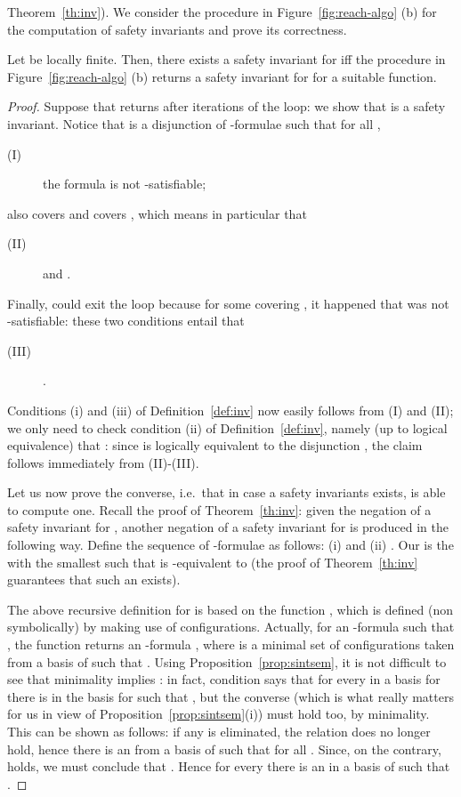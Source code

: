 \documentclass{LMCS}
\theoremstyle{plain}\newtheorem{assumption}[thm]{Assumption}
\theoremstyle{plain}\newtheorem{proposition}[thm]{Proposition}
\theoremstyle{plain}\newtheorem{property}[thm]{Property}
\theoremstyle{plain}\newtheorem{example}[thm]{Example}
\theoremstyle{plain}\newtheorem{claim}[thm]{Claim}
\theoremstyle{plain}\newtheorem{lemma}[thm]{Lemma}
\begin{document}
Theorem~\ref{th:inv}).  We consider the procedure  in
Figure~\ref{fig:reach-algo} (b) for the computation of safety
invariants and prove its correctness.
\begin{thm}
  \label{th:invsymb}
  Let  be locally finite. Then, there exists a safety invariant
  for  iff the procedure  in
  Figure~\ref{fig:reach-algo} (b) returns a safety invariant for 
  for a suitable  function.
\end{thm}
\begin{proof}
  Suppose that  returns  after  iterations of
  the loop: we show that  is a safety invariant.  Notice that
   is a disjunction  of -formulae
  such that for all ,
  \begin{description}
  \item[{\rm (I)}] the formula  is not
    -satisfiable;
  \end{description}
  also  covers  and  covers , which
  means in particular that
  \begin{description}
  \item[{\rm (II)}]  and .
  \end{description}
  Finally,  could exit the loop because for some
   covering , it happened that  was not -satisfiable: these two conditions entail
  that
  \begin{description}
  \item[{\rm (III)}] .
  \end{description}
  Conditions (i) and (iii) of Definition~\ref{def:inv} now easily
  follows from (I) and (II); we only need to check condition (ii) of
  Definition~\ref{def:inv}, namely (up to logical equivalence) that
  : since
   is logically equivalent to the disjunction
  , the claim follows immediately from
  (II)-(III).

  Let us now prove the converse, i.e.\ that in case a safety
  invariants exists,  is able to compute one.  Recall
  the proof of Theorem~\ref{th:inv}: given the negation  of a
  safety invariant for , another negation  of a safety invariant
  for  is produced in the following way. Define the sequence of
  -formulae  as follows: (i)  and (ii)
  . Our  is the 
  with the smallest  such that  is -equivalent to
   (the proof of Theorem~\ref{th:inv} guarantees that such an 
  exists).

  The above recursive definition for  is based on the function
  , which is defined (non symbolically) by making use of
  configurations.  Actually, for an -formula  such that
  , the function 
  returns an -formula ,
  where  is a minimal set
  of configurations taken from a basis of  such that
  . Using Proposition~\ref{prop:sintsem}, it is not difficult to
  see that minimality implies : in fact, condition
   says that for every  in a basis for  there is  in
  the basis  for  such that , but the converse (which is what really matters for us in view of
  Proposition~\ref{prop:sintsem}(i)) must hold too, by
  minimality. This can be shown as follows: if any  is
  eliminated, the relation  does no longer hold, hence there is an
   from a basis of  such that  for all . Since, on the contrary,
   holds, we must conclude that . Hence for every 
  there is an  in a basis of  such that .


\end{proof}
\end{document}
